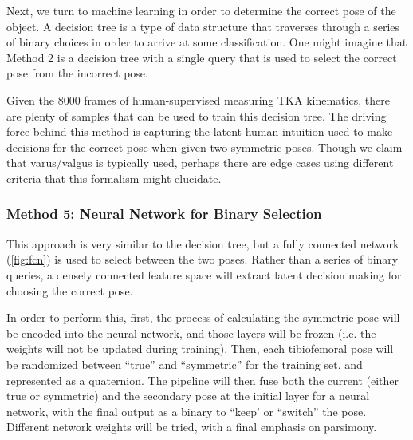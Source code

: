 Next, we turn to machine learning in order to determine the correct pose of the object. A decision tree is a type of data structure that traverses through a series of binary choices in order to arrive at some classification. One might imagine that Method 2 is a decision tree with a single query that is used to select the correct pose from the incorrect pose. 

Given the 8000 frames of human-supervised measuring TKA kinematics, there are plenty of samples that can be used to train this decision tree. The driving force behind this method is capturing the latent human intuition used to make decisions for the correct pose when given two symmetric poses. Though we claim that varus/valgus is typically used, perhaps there are edge cases using different criteria that this formalism might elucidate.

\subsubsection{Method 5: Neural Network for Binary Selection}
This approach is very similar to the decision tree, but a fully connected network (\cref{fig:fcn}) is used to select between the two poses. Rather than a series of binary queries, a densely connected feature space will extract latent decision making for choosing the correct pose.

In order to perform this, first, the process of calculating the symmetric pose will be encoded into the neural network, and those layers will be frozen (i.e. the weights will not be updated during training). Then, each tibiofemoral pose will be randomized between ``true'' and ``symmetric'' for the training set, and represented as a quaternion. The pipeline will then fuse both the current (either true or symmetric) and the secondary pose at the initial layer for a neural network, with the final output as a binary to ``keep' or ``switch'' the pose. Different network weights will be tried, with a final emphasis on parsimony.